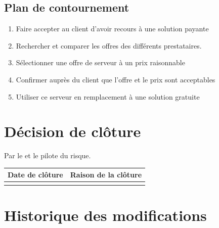 
\flushleft

\subsection*{Plan de contournement}

\begin{enumerate}

	\item Faire accepter au client d'avoir recours à une solution payante

	\item Rechercher et comparer les offres des différents prestataires.

	\item Sélectionner une offre de serveur à un prix raisonnable

	\item Confirmer auprès du client que l'offre et le prix sont acceptables

	\item Utiliser ce serveur en remplacement à une solution gratuite

\end{enumerate}

\section*{Décision de clôture}

Par le \CP{} et le pilote du risque.

\begin{table}[H]

\centering

	\begin{tabularx}{16.8cm}{|X|X|}

	\hline

	\rowcolor{gray!40} Date de clôture & Raison de la clôture \\

	\hline

	  & \\

	\hline

	\end{tabularx}

\end{table}

\section*{Historique des modifications}

